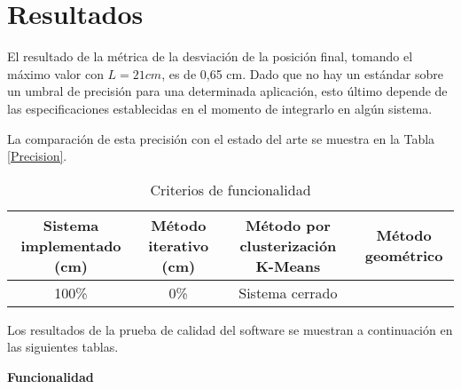 \section{Resultados}

El resultado de la métrica de la desviación de la posición final, tomando el máximo valor con $L = 21 cm$, es de 0,65 cm. Dado que no hay un estándar sobre un umbral de precisión para una determinada aplicación, esto último depende de las especificaciones establecidas en el momento de integrarlo en algún sistema.

La comparación de esta precisión con el estado del arte se muestra en la Tabla \ref{Precision}.

\begin{table}[ht]
	\centering
	\begin{tabular}{|c|c|c|c|}
		\hline
		\textbf{Sistema implementado (cm)} & \textbf{Método iterativo (cm)} & \textbf{Método por clusterización K-Means} & \textbf{Método geométrico} \\
		\hline
		100\% & 0\% & Sistema cerrado \\
		\hline
	\end{tabular}
	\caption{Criterios de funcionalidad}
	\label{tab:Precision}
\end{table}

Los resultados de la prueba de calidad del software se muestran a continuación en las siguientes tablas.

\textbf{Funcionalidad}

